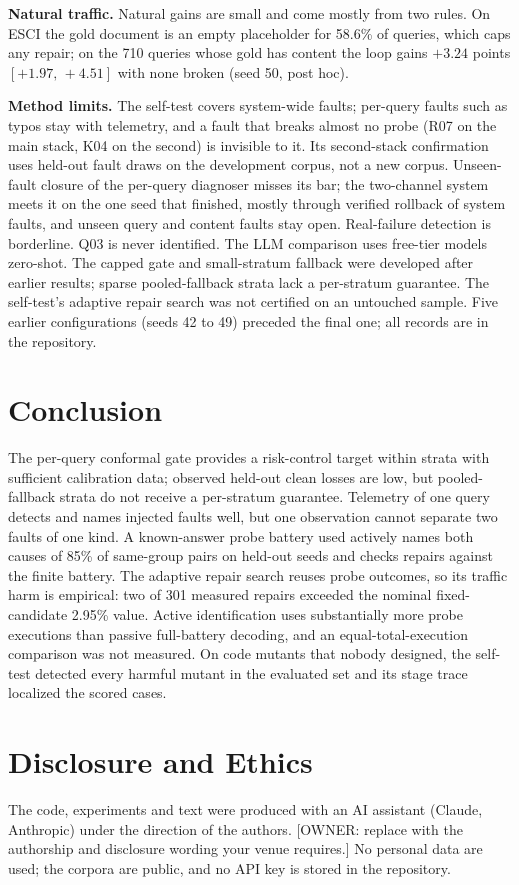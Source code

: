 \documentclass[conference]{IEEEtran}
\newcommand{\ci}[2]{[#1,\,#2]}
\begin{document}
\textbf{Natural traffic.} Natural gains are small and come mostly from two rules. On ESCI the gold document is an empty placeholder for 58.6\% of queries, which caps any repair; on the 710 queries whose gold has content the loop gains $+3.24$ points $\ci{+1.97}{+4.51}$ with none broken (seed 50, post hoc).

\textbf{Method limits.} The self-test covers system-wide faults; per-query faults such as typos stay with telemetry, and a fault that breaks almost no probe (R07 on the main stack, K04 on the second) is invisible to it. Its second-stack confirmation uses held-out fault draws on the development corpus, not a new corpus. Unseen-fault closure of the per-query diagnoser misses its bar; the two-channel system meets it on the one seed that finished, mostly through verified rollback of system faults, and unseen query and content faults stay open. Real-failure detection is borderline. Q03 is never identified. The LLM comparison uses free-tier models zero-shot. The capped gate and small-stratum fallback were developed after earlier results; sparse pooled-fallback strata lack a per-stratum guarantee. The self-test's adaptive repair search was not certified on an untouched sample. Five earlier configurations (seeds 42 to 49) preceded the final one; all records are in the repository.

\section{Conclusion}
The per-query conformal gate provides a risk-control target within strata with sufficient calibration data; observed held-out clean losses are low, but pooled-fallback strata do not receive a per-stratum guarantee. Telemetry of one query detects and names injected faults well, but one observation cannot separate two faults of one kind. A known-answer probe battery used actively names both causes of 85\% of same-group pairs on held-out seeds and checks repairs against the finite battery. The adaptive repair search reuses probe outcomes, so its traffic harm is empirical: two of 301 measured repairs exceeded the nominal fixed-candidate 2.95\% value. Active identification uses substantially more probe executions than passive full-battery decoding, and an equal-total-execution comparison was not measured. On code mutants that nobody designed, the self-test detected every harmful mutant in the evaluated set and its stage trace localized the scored cases.

\section*{Disclosure and Ethics}\label{sec:ethics}
The code, experiments and text were produced with an AI assistant (Claude, Anthropic) under the direction of the authors. [OWNER: replace with the authorship and disclosure wording your venue requires.] No personal data are used; the corpora are public, and no API key is stored in the repository.
\end{document}

